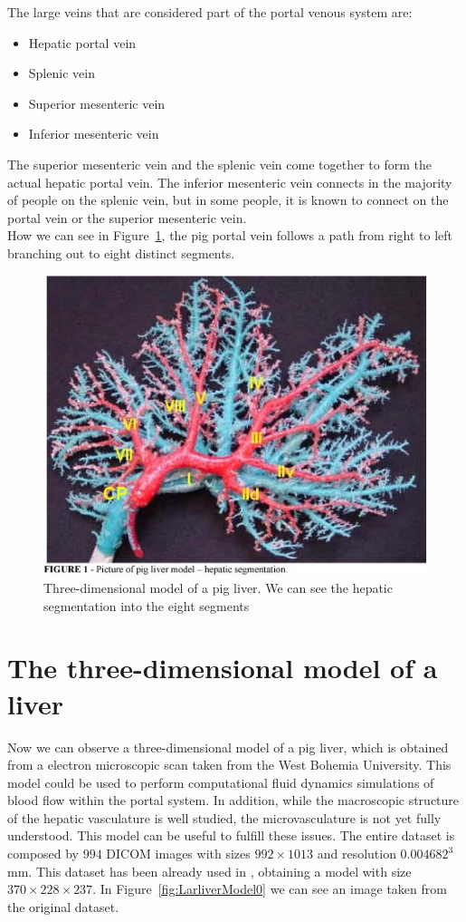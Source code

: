 The large veins that are considered part of the portal venous system are:
\begin{itemize}
 \item Hepatic portal vein
 \item Splenic vein
 \item Superior mesenteric vein
 \item Inferior mesenteric vein
\end{itemize}

The superior mesenteric vein and the splenic vein come together to form the actual hepatic portal vein. The inferior mesenteric vein connects in the majority of people on the splenic vein, but in some people, it is known to connect on the portal vein or the superior mesenteric vein.\\

How we can see in Figure~\ref{fig:liverModel}, the pig portal vein follows a path from right to left branching out to eight distinct segments.

\begin{figure}[htb] %
   \centering
   \includegraphics[width=0.40\linewidth]{images/pigLiverModel.jpg}\hfill
   \caption[Three-dimensional model of a pig liver]{Three-dimensional model of a pig liver. We can see the hepatic segmentation into the eight segments}
   \label{fig:liverModel}
\end{figure}

\section{The three-dimensional model of a liver}\label{sec43:liver3d}

Now we can observe a three-dimensional model of a pig liver, which is obtained from a electron microscopic scan taken from the West Bohemia University. This model could be used to perform computational fluid dynamics simulations of blood flow within the portal system. In addition, while the macroscopic structure of the hepatic vasculature is well studied, the microvasculature is not yet fully understood. This model can be useful to fulfill these issues. The entire dataset is composed by $994$ DICOM images with sizes $992\times1013$ and resolution $0.004682^3$ mm. This dataset has been already used in \cite{Paoluzzi}, obtaining a model with size $370\times228\times237$. In Figure~\ref{fig:LarliverModel0} we can see an image taken from the original dataset.


